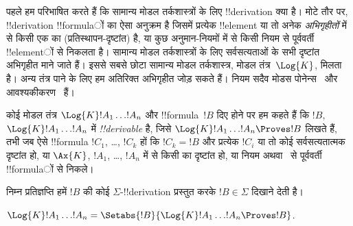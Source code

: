 \documentclass[../../../include/open-logic-section]{subfiles}
\begin{document}


पहले हम परिभाषित करते हैं कि सामान्य मोडल तर्कशास्त्रों के लिए
!!{derivation} क्या है। मोटे तौर पर, !!{derivation} !!{formula}ों का ऐसा
अनुक्रम है जिसमें प्रत्येक !!{element} या तो अनेक \emph{अभिगृहीतों} में से
किसी एक का (प्रतिस्थापन-दृष्टांत) है, या कुछ अनुमान-नियमों में से किसी नियम
से पूर्ववर्ती !!{element}ों से निकलता है। सामान्य मोडल तर्कशास्त्रों के लिए
सर्वसत्यताओं के सभी
दृष्टांत अभिगृहीत माने जाते हैं। इससे सबसे छोटा सामान्य मोडल तर्कशास्त्र,
मोडल तंत्र~$\Log{K}$, मिलता है। अन्य तंत्र पाने के लिए हम अतिरिक्त अभिगृहीत
जोड़ सकते हैं। नियम सदैव मोडस पोनेन्स~\MP{} और आवश्यकीकरण~\Nec{} हैं।

\begin{defn}
  कोई मोडल तंत्र $\Log{K} !A_1 \dots !A_n$ और !!{formula}~$!B$ दिए होने पर
  हम कहते हैं कि $!B$, $\Log{K} !A_1 \dots !A_n$ में
  \emph{!!{derivable}} है, जिसे $\Log{K} !A_1 \dots !A_n \Proves !B$
  लिखते हैं, तभी जब ऐसे !!{formula} $!C_1$, \dots, $!C_k$ हों कि $!C_k=!B$
  और प्रत्येक $!C_i$ या तो कोई सर्वसत्यतात्मक दृष्टांत हो, या $\Ax{K}$,
   $!A_1$, \dots, $!A_n$ में से किसी का
  दृष्टांत हो, या नियम \MP{} अथवा~\Nec{} से पूर्ववर्ती !!{formula}ों से निकले।
\end{defn}

निम्न प्रतिज्ञप्ति हमें $!B$ की कोई $\Sigma$-!!{derivation} प्रस्तुत करके
$!B \in \Sigma$ दिखाने देती है।

\begin{prop}
  $\Log{K} !A_1 \dots !A_n = \Setabs{!B}{\Log{K} !A_1 \dots !A_n \Proves !B}$.
\end{prop}
\end{document}
